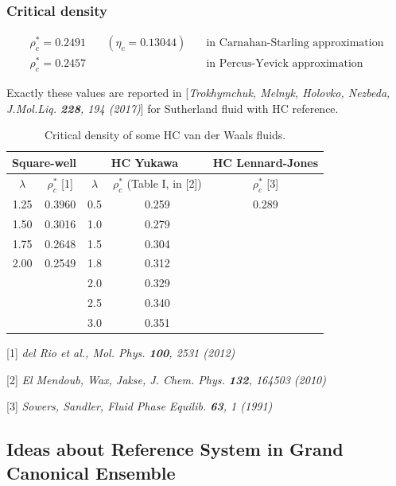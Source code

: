 \documentclass[8pt]{beamer}
\begin{document}
	\begin{frame}
		\frametitle{Critical density}
		
		\begin{eqnarray*}
			\rho^*_c = 0.2491 & \quad (\eta_c = 0.13044) & \quad \text{in Carnahan-Starling approximation}
			\\
			\rho^*_c = 0.2457 & & \quad \text{in Percus-Yevick approximation}
		\end{eqnarray*}
		
		 {
			Exactly these values are reported in [\textit{Trokhymchuk, Melnyk, Holovko, Nezbeda, J.Mol.Liq. \textbf{228}, 194 (2017)}] for Sutherland fluid with HC reference.
		}
		
		\begin{table}[h]
			\noindent\caption{Critical density of some HC van der Waals fluids.}
			\begin{tabular}{|c|c|c|c|c|}
				\hline
				\multicolumn{2}{|c|}{Square-well}& \multicolumn{2}{|c|}{HC Yukawa} &{HC Lennard-Jones} \\
				\hline
				$\lambda$ & $\rho_c^*$ [1]& $\lambda$ & $\rho_c^*$ (Table I, in [2]) & $\rho_c^*$ [3] \\
				\hline
				1.25 & 0.3960 & 0.5 & 0.259 & 0.289 \\
				1.50 & 0.3016 & 1.0 & 0.279 & \\
				1.75 & 0.2648 & 1.5 & 0.304 & \\
				2.00 & 0.2549 & 1.8 & 0.312 & \\
				     &        & 2.0 & 0.329 & \\
				     &        & 2.5 & 0.340 & \\
				     &        & 3.0 & 0.351 & \\
				\hline
			\end{tabular}
		\end{table}
		
		[1] \textit{del Rio et al., Mol. Phys. \textbf{100}, 2531 (2012)}
		
		[2] \textit{El Mendoub, Wax, Jakse, J. Chem. Phys. \textbf{132}, 164503 (2010)}
		
		[3] \textit{Sowers, Sandler, Fluid Phase Equilib. \textbf{63}, 1 (1991)}
	\end{frame}
	
	\subsection{Ideas about Reference System in Grand Canonical Ensemble}
	
\end{document}

